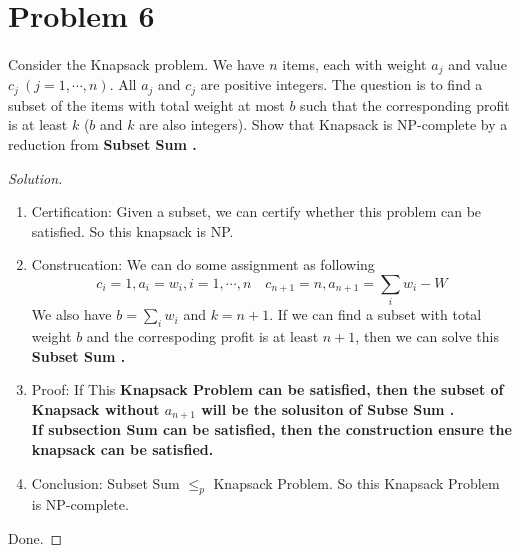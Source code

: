 \documentclass[a4paper]{article}
\newenvironment{solution}
  {\renewcommand\qedsymbol{$\blacksquare$}\begin{proof}[Solution]}
  {\end{proof}}
\begin{document}
\section*{Problem 6}
\paragraph{}
Consider the Knapsack problem. We have $n$ items, each with weight $a_{j}$ and value $c_{j}\ (j = 1, \cdots, n)$. All
$a_{j}$ and $c_{j}$ are positive integers. The question is to find a subset of the items with total weight at most $b$ such
that the corresponding profit is at least $k$ ($b$ and $k$ are also integers). Show that Knapsack is NP-complete
by a reduction from \bfseries Subset Sum \mdseries .

\begin{solution}\
  \begin{enumerate}[(1)]
    \item Certification: Given a subset, we can certify whether this problem can be satisfied. So this knapsack is NP.
    \item Construcation: We can do some assignment as following $$c_{i}=1, a_{i}=w_{i}, i=1,\cdots,n\quad c_{n+1}=n, a_{n+1}=\sum_{i} w_{i}-W$$
    We also have $b=\sum_{i}w_{i}$  and $k=n+1$. If we can find a subset with total weight $b$ and the correspoding profit is at least $n+1$, then we can solve this \bfseries Subset Sum \mdseries.
    \item Proof: If This \bfseries Knapsack Problem \mdseries can be satisfied, then the subset of Knapsack without $a_{n+1}$ will be the solusiton of \bfseries Subse Sum \mdseries.\\
    If \bfseries subsection Sum \mdseries can be satisfied, then the construction ensure the knapsack can be satisfied.
    \item Conclusion: Subset Sum $\le_{p}$ Knapsack Problem. So this Knapsack Problem is NP-complete.
  \end{enumerate}
  Done.
\end{solution}
\end{document}
